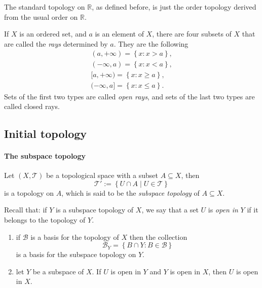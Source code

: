 \begin{example}
  The standard topology on \( \mathbb{R} \), as defined before, is just the order topology derived from the usual order on \( \mathbb{R} \).
\end{example}

\begin{definition}
  If \( X \) is an ordered set, and \( a \) is an element of \( X \), there are four subsets of \( X \) that are called the \emph{rays} determined by \( a \).
  They are the following
  \begin{align*}
    (a, +\infty) = \left\lbrace x: x > a \right\rbrace,\\
    (-\infty, a) = \left\lbrace x: x < a \right\rbrace,\\
    [a, +\infty) = \left\lbrace x: x \geq a \right\rbrace,\\
    (-\infty, a] = \left\lbrace x: x \leq a \right\rbrace
  .\end{align*}
  Sets of the first two types are called \emph{open rays}, and sets of the last two types are called closed rays.
\end{definition}

\subsection{Initial topology}

\paragraph{The subspace topology}

\begin{definition}
  Let \( (X, \mathcal{T}) \) be a topological space with a subset \( A \subseteq X \), then
  \[
    \mathcal{T}' := \left\lbrace U \cap A \mid U \in \mathcal{T} \right\rbrace
  \]
  is a topology on \( A \), which is said to be the \emph{subspace topology} of \( A \subseteq X \).
\end{definition}

Recall that: if \( Y \) is a subspace topology of \( X \), we say that a set \( U \) is \emph{open in} \( Y \) if it belongs to the topology of \( Y \).

\begin{lemma}
  \begin{enumerate}
    \item if \( \mathcal{B} \) is a basis for the topology of \( X \) then the collection
      \[
        \mathcal{B}_Y = \left\lbrace B \cap Y: B \in \mathcal{B} \right\rbrace
      \]
      is a basis for the subspace topology on \( Y \).
    \item let \( Y \) be a subspace of \( X \).
      If \( U \) is open in \( Y \) and \( Y \) is open in \( X \), then \( U \) is open in \( X \).
  \end{enumerate}
\end{lemma}


